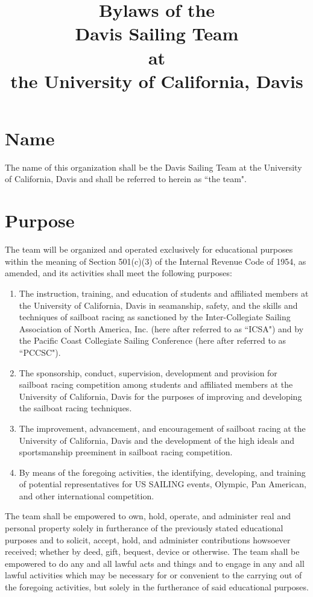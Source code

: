 \documentclass[12pt,titlepage,letter]{article}
\title{Bylaws of the\\Davis Sailing Team\\at\\the University of California, Davis}
\date{}
\begin{document}
\maketitle

\tableofcontents

\section{Name}

The name of this organization shall be the Davis Sailing Team at the University of California, Davis and shall be referred to herein as ``the team".

\section{Purpose}

The team will be organized and operated exclusively for educational purposes within the meaning of Section 501(c)(3) of the Internal Revenue Code of 1954, as amended, and its activities shall meet the following purposes:

\begin{enumerate}
\item
The instruction, training, and education of students and affiliated members at the University of California, Davis in seamanship, safety, and the skills and techniques of sailboat racing as sanctioned by the Inter-Collegiate Sailing Association of North America, Inc. (here after referred to as ``ICSA") and by the Pacific Coast Collegiate Sailing Conference (here after referred to as ``PCCSC").
\item
The sponsorship, conduct, supervision, development and provision for sailboat racing competition among students and affiliated members at the University of California, Davis for the purposes of improving and developing the sailboat racing techniques.
\item
The improvement, advancement, and encouragement of sailboat racing at the University of California, Davis and the development of the high ideals and sportsmanship preeminent in sailboat racing competition.
\item
By means of the foregoing activities, the identifying, developing, and training of potential representatives for US SAILING events, Olympic, Pan American, and other international competition.
\end{enumerate}

The team shall be empowered to own, hold, operate, and administer real and personal property solely in furtherance of the previously stated educational purposes and to solicit, accept, hold, and administer contributions howsoever received; whether by deed, gift, bequest, device or otherwise. The team shall be empowered to do any and all lawful acts and things and to engage in any and all lawful activities which may be necessary for or convenient to the carrying out of the foregoing activities, but solely in the furtherance of said educational purposes.  
\end{document}
